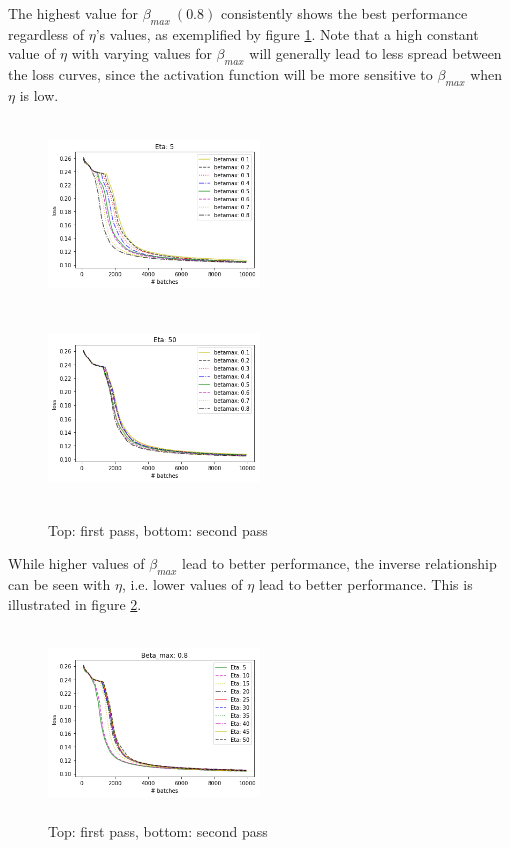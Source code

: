 \documentclass{article}
\begin{document}
The highest value for $\beta_{max} \ (0.8)$ consistently shows the best performance regardless of $\eta$'s values, as exemplified by figure \ref{fig:hyper1}. Note that a high constant value of $\eta$ with varying values for $\beta_{max}$ will generally lead to less spread between the loss curves, since the activation function will be more sensitive to $\beta_{max}$ when $\eta$ is low. 

\begin{figure}[H]
      \centering
      \includegraphics[width=0.5\textwidth,height=5cm,keepaspectratio]{img/appendix/hyper/eta5.png}
      \includegraphics[width=0.5\textwidth,height=5cm,keepaspectratio]{img/appendix/hyper/eta50.png}
      \caption{Top: first pass, bottom: second pass}
      \label{fig:hyper1}
  \end{figure}

While higher values of $\beta_{max}$ lead to better performance, the inverse relationship can be seen with $\eta$, i.e. lower values of $\eta$ lead to better performance. This is illustrated in figure \ref{fig:hyper2}.  

\begin{figure}[H]
      \centering
      \includegraphics[width=0.5\textwidth,height=5cm,keepaspectratio]{img/appendix/hyper/betamax08.png}
      
      \caption{Top: first pass, bottom: second pass}
      \label{fig:hyper2}
 \end{figure}
 
\end{document}
